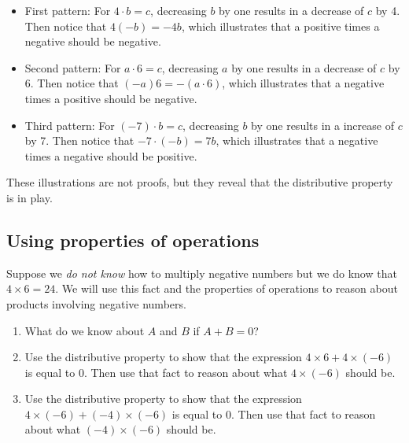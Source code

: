 \documentclass{ximera}
\begin{document}
\begin{problem}
\begin{teachingnote}
\begin{itemize}
\item First pattern:  For $4\cdot b = c$, decreasing $b$ by one results in a decrease of $c$ by 4.  Then notice that $4(-b) = -4b$, which illustrates that a positive times a negative should be negative. 
\item Second pattern:  For $a\cdot 6= c$, decreasing $a$ by one results in a decrease of $c$ by 6.  Then notice that $(-a)6 = -(a\cdot 6)$, which illustrates that a negative times a positive should be negative.  
\item Third pattern:  For $(-7)\cdot b= c$, decreasing $b$ by one results in a increase of $c$ by 7.  Then notice that $-7\cdot (-b) = 7b $, which illustrates that a negative times a negative should be positive. 
\end{itemize}
These illustrations are not proofs, but they reveal that the distributive property is in play.  
\end{teachingnote}
\end{problem}

\subsection*{Using properties of operations}

\begin{problem}
Suppose we \emph{do not know} how to multiply negative numbers but we do know that $4\times 6=24$. We will use this fact and the properties of operations to reason about products involving negative numbers.  
\begin{enumerate}
\item What do we know about $A$ and $B$ if $A+B=0$?  
\item Use the distributive property to show that the expression $4\times 6 + 4\times(-6)$ is equal to $0$.  
Then use that fact to reason about what $4\times(-6)$ should be.  
\item Use the distributive property to show that the expression $4\times (-6) + (-4)\times (-6)$ is equal to $0$.  
Then use that fact to reason about what $(-4)\times(-6)$ should be.  
\end{enumerate}
\end{problem}
\end{document}
